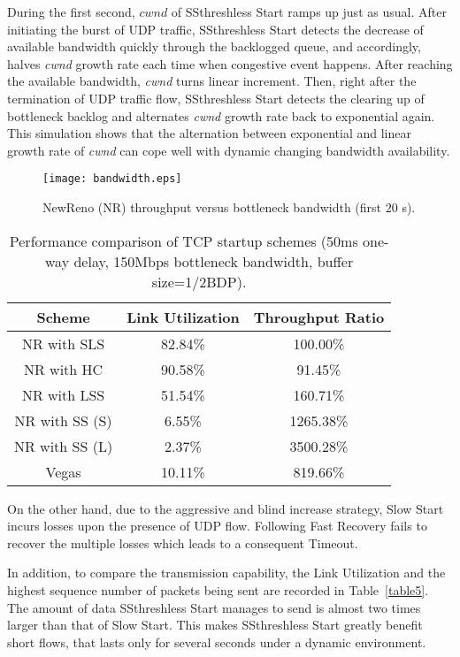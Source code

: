 \documentclass[12pt,onecolumn]{IEEEtran}
\begin{document}
During the first second, $cwnd$ of SSthreshless Start ramps up just as usual.
After initiating the burst of UDP traffic, SSthreshless Start detects the
decrease of available bandwidth quickly through the backlogged queue, and
accordingly, halves \emph{cwnd} growth rate each time when congestive event
happens. After reaching the available bandwidth, \emph{cwnd} turns linear
increment. Then, right after the termination of UDP traffic flow, SSthreshless
Start detects the clearing up of bottleneck backlog and alternates \emph{cwnd}
growth rate back to exponential again. This simulation shows that the
alternation between exponential and linear growth rate of \emph{cwnd} can cope
well with dynamic changing bandwidth availability.

\begin{figure}
\centering
\texttt{[image: bandwidth.eps]}
\caption{NewReno (NR) throughput versus bottleneck bandwidth (first $20$ s).} \label{fig_Bandwidth}
\end{figure}
\begin{table}[h]
\centering
\label{table2}\caption{\footnotesize Performance comparison of TCP startup schemes (50ms one-way delay, 150Mbps bottleneck bandwidth, buffer size=1/2BDP).} \begin{tabular}{|c|c|c|} \hline
Scheme & Link Utilization & Throughput Ratio\\ \hline \hline
NR with SLS & 82.84\%  &   100.00\% \\ \hline
NR with HC & 90.58\%  &   91.45\%  \\ \hline
NR with LSS & 51.54\%  &   160.71\%  \\ \hline
NR with SS (S) &   6.55\% & 1265.38\%  \\ \hline
NR with SS (L) & 2.37\%  &   3500.28\% \\ \hline
Vegas  & 10.11\%  &   819.66\%  \\ \hline
\end{tabular}
\end{table}


On the other hand, due to the aggressive and blind increase strategy, Slow
Start incurs losses upon the presence of UDP flow. Following Fast Recovery
fails to recover the multiple losses which leads to a consequent Timeout.

In addition, to compare the transmission capability, the Link Utilization and
the highest sequence number of packets being sent are recorded in Table~\ref{table5}. The amount of
data SSthreshless Start manages to send is almost two times larger than that of
Slow Start. This makes SSthreshless Start greatly benefit short flows, that
lasts only for several seconds under a dynamic environment.
\end{document}
